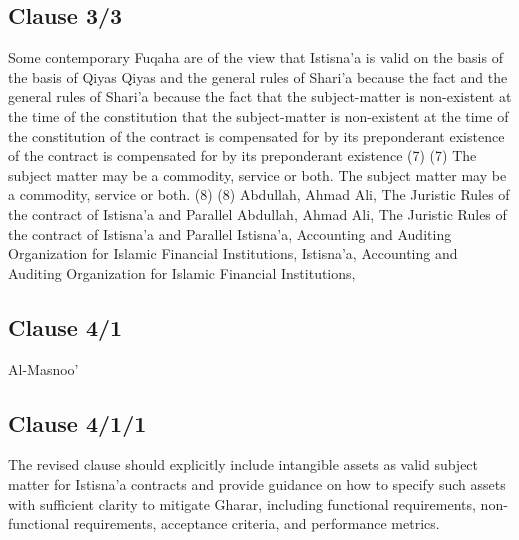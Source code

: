 \documentclass{article}%
\begin{document}
%
\subsection{Clause 3/3}%
\label{subsec:Clause3/3}%
Some contemporary Fuqaha are of the view that Istisna’a is valid on  the basis of  the basis of Qiyas Qiyas and the general rules of Shari’a because the fact   and the general rules of Shari’a because the fact  that the subject-matter is non-existent at the time of the constitution  that the subject-matter is non-existent at the time of the constitution  of the contract is compensated for by its preponderant existence  of the contract is compensated for by its preponderant existence  (7) (7) The subject matter may be a commodity, service or both.  The subject matter may be a commodity, service or both. (8) (8) Abdullah, Ahmad Ali, The Juristic Rules of the contract of Istisna’a and Parallel   Abdullah, Ahmad Ali, The Juristic Rules of the contract of Istisna’a and Parallel  Istisna’a, Accounting and Auditing Organization for Islamic Financial Institutions,  Istisna’a, Accounting and Auditing Organization for Islamic Financial Institutions,

%
\subsection{Clause 4/1}%
\label{subsec:Clause4/1}%
Al-Masnoo’

%
\subsection{Clause 4/1/1}%
\label{subsec:Clause4/1/1}%
The revised clause should explicitly include intangible assets as valid subject matter for Istisna'a contracts and provide guidance on how to specify such assets with sufficient clarity to mitigate Gharar, including functional requirements, non-functional requirements, acceptance criteria, and performance metrics.

%
\end{document}
